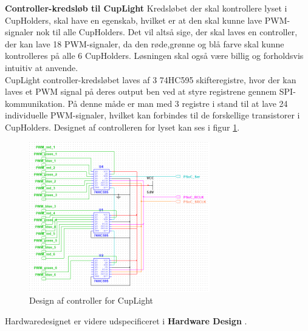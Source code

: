 \documentclass[Rapport/Rapport_main.tex]{subfiles}
\begin{document}
\textbf{Controller-kredsløb til CupLight}
Kredsløbet der skal kontrollere lyset i CupHolders, skal have en egenskab, hvilket er at den skal kunne lave PWM-signaler nok til alle CupHolders. Det vil altså sige, der skal laves en controller, der kan lave 18 PWM-signaler, da den røde,grønne og blå farve skal kunne kontrolleres på alle 6 CupHolders. Løsningen skal også være billig og forholdsvis intuitiv at anvende.\\
CupLight controller-kredsløbet laves af 3 74HC595 skifteregistre\cite{datasheet_shiftreg}, hvor der kan laves et PWM signal på deres output ben ved at styre registrene gennem SPI-kommunikation. På denne måde er man med 3 registre i stand til at lave 24 individuelle PWM-signaler, hvilket kan forbindes til de forskellige transistorer i CupHolders. Designet af controlleren for lyset kan ses i figur \ref{fig:rap_cuplight_controller}.
\begin{figure}[H]
    \centering
    \includegraphics[width=0.7\textwidth]{HardwareDesign/CupLight/graphics/CupLight_HW_Controller.png}
    \caption{Design af controller for CupLight}
    \label{fig:rap_cuplight_controller}
\end{figure}
Hardwaredesignet er videre udspecificeret i \textbf{Hardware Design} .
\end{document}
